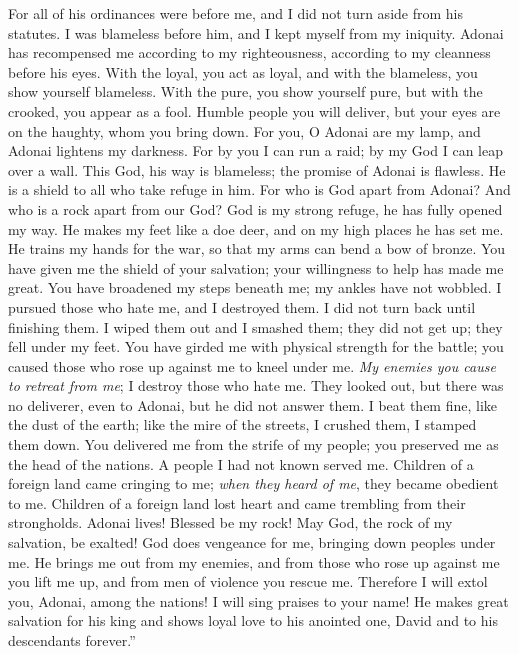 \begin{biblechapter}
\verse For all of his ordinances were before me, 
and I did not turn aside from his statutes.
\verse I was blameless before him, 
and I kept myself from my iniquity.
\verse Adonai has recompensed me according to my righteousness, 
according to my cleanness before his eyes.
\verse With the loyal, you act as loyal, 
and with the blameless, you show yourself blameless.
\verse With the pure, you show yourself pure, 
but with the crooked, you appear as a fool.
\verse Humble people you will deliver, 
but your eyes are on the haughty, whom you bring down.
\verse For you, O Adonai are my lamp, 
and Adonai lightens my darkness.
\verse For by you I can run a raid; 
by my God I can leap over a wall.
\verse This God, his way is blameless; 
the promise of Adonai is flawless. 
He is a shield to all who take refuge in him.
\verse For who is God apart from Adonai? 
And who is a rock apart from our God?
\verse God is my strong refuge, 
he has fully opened my way.
\verse He makes my feet like a doe deer, 
and on my high places he has set me.
\verse He trains my hands for the war, 
so that my arms can bend a bow of bronze.
\verse You have given me the shield of your salvation; 
your willingness to help has made me great.
\verse You have broadened my steps beneath me; 
my ankles have not wobbled.
\verse I pursued those who hate me, and I destroyed them. 
I did not turn back until finishing them.
\verse I wiped them out and I smashed them; 
they did not get up; they fell under my feet.
\verse You have girded me with physical strength for the battle; 
you caused those who rose up against me to kneel under me.
\verse \textit{My enemies you cause to retreat from me}; 
I destroy those who hate me.
\verse They looked out, but there was no deliverer, 
even to Adonai, but he did not answer them.
\verse I beat them fine, like the dust of the earth; 
like the mire of the streets, I crushed them, I stamped them down.
\verse You delivered me from the strife of my people; 
you preserved me as the head of the nations. 
A people I had not known served me.
\verse Children of a foreign land came cringing to me; 
\textit{when they heard of me}, they became obedient to me.
\verse Children of a foreign land lost heart 
and came trembling from their strongholds.
\verse Adonai lives! Blessed be my rock! 
May God, the rock of my salvation, be exalted!
\verse God does vengeance for me, 
bringing down peoples under me.
\verse He brings me out from my enemies, 
and from those who rose up against me you lift me up, 
and from men of violence you rescue me.
\verse Therefore I will extol you, Adonai, among the nations! 
I will sing praises to your name!
\verse He makes great salvation for his king 
and shows loyal love to his anointed one, David 
and to his descendants forever.”
\end{biblechapter}

